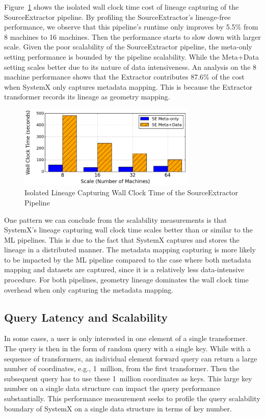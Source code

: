 \documentclass{sig-alternate}
\begin{document}
Figure~\ref{fig:SE-overhead} shows the isolated wall clock time cost of lineage capturing of the SourceExtractor pipeline.
By profiling the SourceExtractor's lineage-free performance, we observe that this pipeline's runtime only improves by 5.5\% from 8 machines
to 16 machines. Then the performance starts to slow down with larger scale.
Given the poor scalability of the SourceExtractor pipeline, the meta-only setting performance is bounded by the pipeline scalability.
While the Meta+Data setting scales better due to its nature of data intensiveness.
An analysis on the 8 machine performance shows that the Extractor contributes 87.6\% of the cost when SystemX only captures metadata mapping.
This is because the Extractor transformer records its lineage as geometry mapping.
\begin{figure}[t]
\begin{center}
    \includegraphics[width=85mm]{pictures/Overhead-Time-SE}
\caption {Isolated Lineage Capturing Wall Clock Time of the SourceExtractor Pipeline
    \label{fig:SE-overhead}
}
\end{center}
\end{figure}

One pattern we can conclude from the scalability measurements is that SystemX's lineage capturing wall clock 
time scales better than or similar to the ML pipelines.
This is due to the fact that SystemX captures and stores the lineage in a distributed manner. 
The metadata mapping capturing is more likely to be impacted by the ML pipeline compared to the case where both metadata
mapping and datasets are captured, since it is a relatively less data-intensive procedure.
For both pipelines, geometry lineage dominates the wall clock time overhead when only capturing the metadata mapping.


\subsection{Query Latency and Scalability}
In some cases, a user is only interested in one element of a single transformer.
The query is then in the form of random query with a single key.
While with a sequence of transformers, an individual element forward query 
can return a large number of coordinates, e.g., 1~million, from the first transformer. 
Then the subsequent query has to use these 1~million coordinates as keys.
This large key number on a single data structure can impact the query performance substantially.  
This performance measurement seeks to profile the query scalability boundary of SystemX on a single data structure in terms of key number. 
\end{document}
